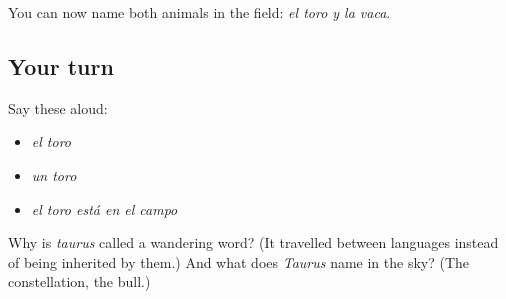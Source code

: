 \begin{grammarlens}[title={What you've built}]
You can now name both animals in the field: \emph{el toro y la vaca}.
\end{grammarlens}

\subsection*{Your turn}
Say these aloud:

\begin{itemize}
\raggedright
  \item \emph{el toro}
  \item \emph{un toro}
  \item \emph{el toro está en el campo}
\end{itemize}

\begin{tcolorbox}[breakable,colback=teal!4,colframe=teal!35!black,title={Before you move on}]
Why is \emph{taurus} called a wandering word? (It travelled between languages instead of being inherited by them.) And what does \emph{Taurus} name in the sky? (The constellation, the bull.)
\end{tcolorbox}
